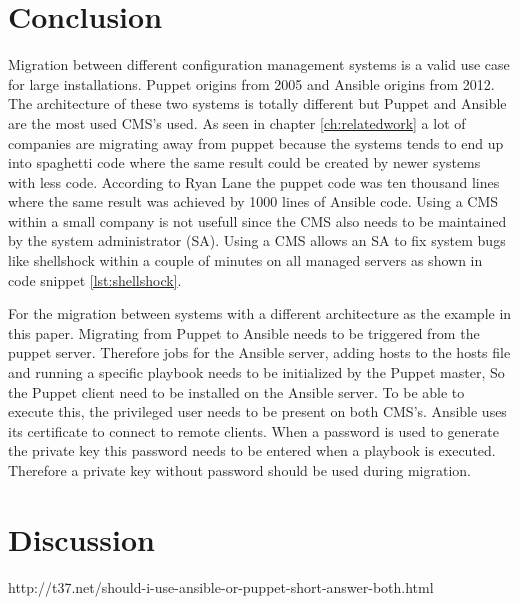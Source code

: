 \section{Conclusion}\label{sec:conclusion}
Migration between different configuration management systems is a valid use case for large installations. Puppet origins from 2005 and Ansible origins from 2012. The architecture of these two systems is totally different but Puppet and Ansible are the most used CMS's used. As seen in chapter \ref{ch:relatedwork} a lot of companies are migrating away from puppet because the systems tends to end up into spaghetti code \cite{movingawayfrompuppet} where the same result could be created by newer systems with less code. According to Ryan Lane \cite{movingawayfrompuppet} the puppet code was ten thousand lines where the same result was achieved by 1000 lines of Ansible code. Using a CMS within a small company is not usefull since the CMS also needs to be maintained by the system administrator (SA). Using a CMS allows an SA to fix system bugs like shellshock within a couple of minutes on all managed servers as shown in code snippet \ref{lst:shellshock}.

For the migration between systems with a different architecture as the example in this paper. Migrating from Puppet to Ansible needs to be triggered from the puppet server. Therefore jobs for the Ansible server, adding hosts to the hosts file and running a specific playbook needs to be initialized by the Puppet master, So the Puppet client need to be installed on the Ansible server. To be able to execute this, the privileged user needs to be present on both CMS's. Ansible uses its certificate to connect to remote clients. When a password is used to generate the private key this password needs to be entered when a playbook is executed. Therefore a private key without password should be used during migration.   




\section{Discussion}\label{sec:discussion}
http://t37.net/should-i-use-ansible-or-puppet-short-answer-both.html

